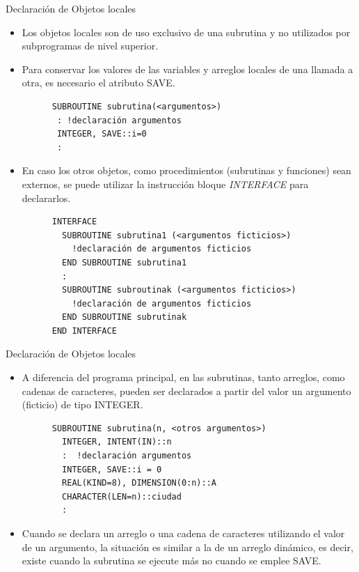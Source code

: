 \begin{frame}[fragile]{Declaración de Objetos locales}
 \begin{itemize}[<+(0)->]
  \item Los objetos locales son de uso exclusivo de una subrutina y no utilizados por subprogramas de nivel superior.
  \item Para conservar los valores de las variables y arreglos locales de una llamada a otra, es necesario el atributo SAVE.
   \vspace{0.15cm}
      \begin{verbatim}
      SUBROUTINE subrutina(<argumentos>)
       : !declaración argumentos
       INTEGER, SAVE::i=0
       :
      \end{verbatim}
  \item En caso los otros objetos, como procedimientos (subrutinas y funciones) sean externos, se puede utilizar la instrucción bloque \emph{INTERFACE} para declararlos.
   \vspace{0.15cm}
      \begin{verbatim}
      INTERFACE
        SUBROUTINE subrutina1 (<argumentos ficticios>)
          !declaración de argumentos ficticios
        END SUBROUTINE subrutina1
        :
        SUBROUTINE subroutinak (<argumentos ficticios>)
          !declaración de argumentos ficticios
        END SUBROUTINE subrutinak
      END INTERFACE
      \end{verbatim} 
 \end{itemize}
\end{frame}

\begin{frame}[fragile]{Declaración de Objetos locales}
 \begin{itemize}[<+(0)->]
  \item A diferencia del programa principal, en las subrutinas, tanto arreglos, como cadenas de caracteres, pueden ser declarados a partir del valor un argumento (ficticio) de tipo INTEGER.
   \vspace{0.15cm}
      \begin{verbatim}
      SUBROUTINE subrutina(n, <otros argumentos>)
        INTEGER, INTENT(IN)::n
        :  !declaración argumentos
        INTEGER, SAVE::i = 0
        REAL(KIND=8), DIMENSION(0:n)::A
        CHARACTER(LEN=n)::ciudad
        :
      \end{verbatim}
  \item Cuando se declara un arreglo o una cadena de caracteres utilizando el valor de un argumento, la situación es similar a la de un arreglo dinámico, es decir, existe cuando la subrutina se ejecute más no cuando se emplee SAVE.
 \end{itemize}
\end{frame}


